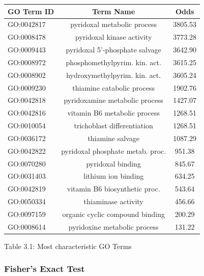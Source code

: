 \documentclass[10pt,twocolumn,letterpaper]{article}
\begin{document}
\begin{center}
    \begin{tabular}{lcc}
        \toprule
        GO Term ID & Term Name & Odds \\
        \midrule
        GO:0042817	& \small{pyridoxal metabolic process} &	3805.53 \\
        GO:0008478	& \small{pyridoxal kinase activity} &	3773.28 \\
        GO:0009443	& \small{pyridoxal 5'-phosphate salvage} &	3642.90 \\
        GO:0008972	& \small{phosphomethylpyrim. kin. act.} &	3615.25 \\
        GO:0008902	& \small{hydroxymethylpyrim. kin. act.} &	3605.24 \\
        GO:0009230	& \small{thiamine catabolic process} &	1902.76 \\
        GO:0042818	& \small{pyridoxamine metabolic process} &	1427.07\\
        GO:0042816	& \small{vitamin B6 metabolic process} &	1268.51\\
        GO:0010054	& \small{trichoblast differentiation} &	1268.51 \\
        GO:0036172	& \small{thiamine salvage} &	1087.29 \\
        GO:0042822	& \small{pyridoxal phosphate metab. proc.} &	951.38 \\
        GO:0070280	& \small{pyridoxal binding} &	845.67 \\
        GO:0031403	& \small{lithium ion binding} &	634.25 \\
        GO:0042819	& \small{vitamin B6 biosynthetic proc.} &	543.64 \\
        GO:0050334	& \small{thiaminase activity} &	456.66 \\
        GO:0097159	& \small{organic cyclic compound binding} &	200.29 \\
        GO:0008614	& \small{pyridoxine metabolic process} &	131.22 \\
        \bottomrule
    \end{tabular}
\end{center} 
\begin{center}
    \small{Table 3.1: Most characteristic GO Terms}
\end{center}

\subsubsection{Fisher's Exact Test}
\end{document}
